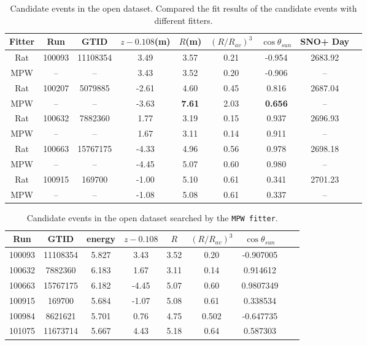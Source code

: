 \begin{table}[ht]
	\centering
	\caption[Candidate events in the open dataset.]{Candidate events in the open dataset. Compared the fit results of the candidate events with different fitters.}
	\label{opendata}
	\begin{tabular*}{150mm}{c@{\extracolsep{\fill}}cccccccc}
		\toprule
		Fitter &	Run &  GTID &  $z-0.108$(m) & $R$(m)& $(R/R_{av})^3$ & $\cos\theta_{sun}$ & SNO+ Day\\
		\hline 
		Rat & 100093 &11108354 &3.49 &3.57 &0.21 &-0.954 &2683.92 \\	
		MPW &  --& --& 3.43 &	3.52 &	0.20	& -0.906 & --\\
		Rat &	100207 &5079885 &-2.61 &4.60 &0.45 &0.816 &2687.04\\
		MPW &	 --& --& -3.63 & \textbf{7.61} &	2.03 & \textbf{0.656} & -- \\
		Rat &100632 &7882360 &1.77 &3.19 &0.15 &0.937 &2696.93\\
		MPW &    --& --&  1.67 & 3.11 &	0.14 & 0.911 & -- \\
		Rat &100663 &15767175 &-4.33& 4.96 &0.56 &0.978 &2698.18\\
		MPW & --& -- &-4.45 &	5.07 &	0.60 &	0.980 & -- \\
		Rat &100915 &169700 &-1.00 &5.10 &0.61 &0.341 &2701.23\\
		MPW &	--& --& -1.08 &	5.08 &	0.61 &	0.337 & -- \\	
		\bottomrule
	\end{tabular*}
\end{table}

\begin{table}[ht]
	\centering
	\caption{Candidate events in the open dataset searched by the \texttt{MPW fitter}.}
	\label{opendataMPW}
	\begin{tabular*}{150mm}{c@{\extracolsep{\fill}}cccccccc}
		\toprule
		Run & GTID & energy & $z-0.108$ & $R$ & $(R/R_{av})^3$ & $\cos\theta_{sun}$\\
		\hline 
		100093 &	11108354	&5.827 & 3.43 & 3.52 & 0.20 & -0.907005\\
		100632&	7882360    &6.183& 1.67 &3.11 &0.14 &0.914612\\
		100663&	15767175   &	6.182 & -4.45 &5.07 &0.60&	0.9807349\\
		100915&	169700   &	5.684 &	-1.07 &5.08 &0.61&0.338534\\
		100984&	8621621&	5.701 & 0.76 &4.75 &0.502&-0.647735\\
		101075&	11673714&	5.667 &4.43 &5.18 &0.64& 0.587303\\
		\bottomrule
	\end{tabular*}
\end{table}

